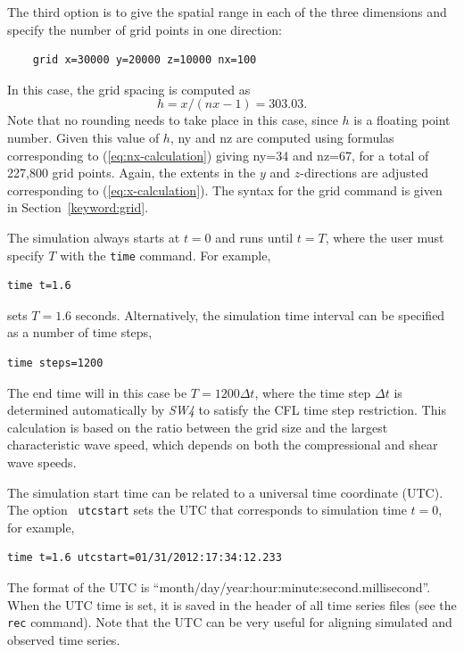 \documentclass[11pt]{report}
\begin{document}
The third option is to give the spatial range in each of the three dimensions and specify the number
of grid points in one direction:
%
\begin{verbatim}
	grid x=30000 y=20000 z=10000 nx=100
\end{verbatim}
%
In this case, the grid spacing is computed as
\[
	h = x/(nx-1)= 303.03.
\]
Note that no rounding needs to take place in this case, since $h$ is a floating point number. Given this
value of $h$, ny and nz are computed using formulas corresponding to
(\ref{eq:nx-calculation}) giving ny=34 and nz=67, for a total of 227,800 grid points. Again,
the extents in the $y$ and $z$-directions are adjusted corresponding to (\ref{eq:x-calculation}). The syntax
for the grid command is given in Section~\ref{keyword:grid}.

The simulation always starts at $t=0$ and runs until $t=T$, where the user must specify $T$ with the
	{\tt time} command. For example,
\begin{verbatim}
time t=1.6
\end{verbatim}
sets $T=1.6$ seconds. Alternatively, the simulation time interval can be specified as
a number of time steps,
\begin{verbatim}
time steps=1200
\end{verbatim}
The end time will in this case be $T=1200\Delta t$,
where the time step $\Delta t$ is determined automatically by \emph{SW4} to satisfy the CFL time
step restriction. This calculation is based on the ratio between the grid size and the largest
characteristic wave speed, which depends on both the compressional and shear wave speeds.

The simulation start time can be related to a universal time coordinate (UTC). The option {\tt
		utcstart} sets the UTC that corresponds to simulation time $t=0$, for example,
\begin{verbatim}
time t=1.6 utcstart=01/31/2012:17:34:12.233
\end{verbatim}
The format of the UTC is ``month/day/year:hour:minute:second.millisecond''. When the UTC time
is set, it is saved in the header of all time series files (see the {\tt rec} command). Note that
the UTC can be very useful for aligning simulated and observed time series.
\end{document}
